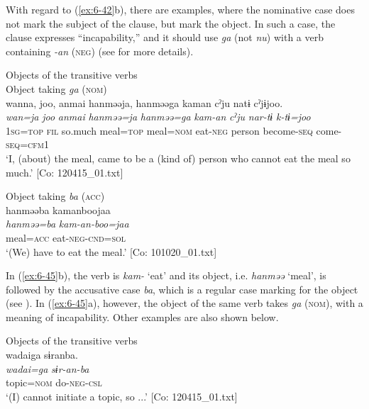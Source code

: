   With regard to (\ref{ex:6-42}b), there are examples, where the nominative case does not mark the subject of the clause, but mark the object. In such a case, the clause expresses “incapability,” and it should use \textit{ga} (not \textit{nu}) with a verb containing \textit{-an} (\textsc{neg}) (see  for more details).

\ea\label{ex:6-45}
 Objects of the transitive verbs\\

 \ea Object taking \textit{ga} (\textsc{nom})\\
{\TM}
\glll  wanna,  joo,  anmai  hanməəja,  hanməəga  kaman  cˀju  natɨ  cˀjɨjoo.\\
\textit{wan=ja}  \textit{joo}  \textit{anmai}  \textit{hanməə=ja} \textit{hanməə=ga}  \textit{kam-an}  \textit{cˀju}  \textit{nar-tɨ}  \textit{k-tɨ=joo}\\
1\textsc{sg}=\textsc{top}  \textsc{fil}  so.much  meal=\textsc{top}  meal=\textsc{nom}  eat-\textsc{neg}  person  become-\textsc{seq}  come-\textsc{seq}=\textsc{cfm}1\\
\glt ‘I, (about) the meal, came to be a (kind of) person who cannot eat the meal so much.’ [Co: 120415\_01.txt]

\ex Object taking \textit{ba} (\textsc{acc})\\
{\TM}
\glll  hanməəba  kamanboojaa\\
\textit{hanməə=ba}  \textit{kam-an-boo=jaa}\\
meal=\textsc{acc}  eat-\textsc{neg}-\textsc{cnd}=\textsc{sol}\\
\glt ‘(We) have to eat the meal.’ [Co: 101020\_01.txt]
\z
\z

In (\ref{ex:6-45}b), the verb is \textit{kam-} ‘eat’ and its object, i.e. \textit{hanməə} ‘meal’, is followed by the accusative case \textit{ba}, which is a regular case marking for the object (see ). In (\ref{ex:6-45}a), however, the object of the same verb takes \textit{ga} (\textsc{nom}), with a meaning of incapability. Other examples are also shown below.

\ea\label{ex:6-46}
 Objects of the transitive verbs\\

\ea
{\TM}
\glll {\textbar}wadai{\textbar}ga  sɨranba.\\
\textit{wadai=ga}  \textit{sɨr-an-ba}\\
topic=\textsc{nom}  do-\textsc{neg}-\textsc{csl}\\
\glt ‘(I) cannot initiate a topic, so ...’ [Co: 120415\_01.txt]

